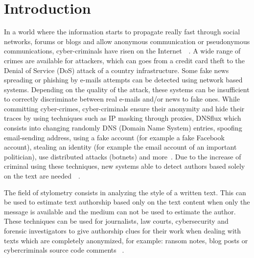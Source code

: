 
\chapter{Introduction \label{sec:introduction}}

In a world where the information starts to propagate really fast through social networks, forums or blogs and allow anonymous communication or pseudonymous communications, cyber-criminals have risen on the Internet~\cite{automated_unsupervised}~\cite{kocher_pan16}.
A wide range of crimes are available for attackers, which can goes from a credit card theft to the Denial of Service (DoS) attack of a country infrastructure.
Some fake news spreading or phishing by e-mails attempts can be detected using network based systems.
Depending on the quality of the attack, these systems can be insufficient to correctly discriminate between real e-mails and/or news to fake ones.
While committing cyber-crimes, cyber-criminals ensure their anonymity and hide their traces by using techniques such as IP masking through proxies, DNSflux which consists into changing randomly DNS (Domain Name System) entries, spoofing email-sending address, using a fake account (for example a fake Facebook account), stealing an identity (for example the email account of an important politician), use distributed attacks (botnets) and more~\cite{attribution_in_cyberspace}.
Due to the increase of criminal using these techniques, new systems able to detect authors based solely on the text are needed~\cite{automated_unsupervised}~\cite{unine_pan20_fake_news}.

The field of stylometry consists in analyzing the style of a written text.
This can be used to estimate text authorship based only on the text content when only the message is available and the medium can not be used to estimate the author.
These techniques can be used for journalists, law courts, cybersecurity and forensic investigators to give authorship clues for their work when dealing with texts which are completely anonymized, for example: ransom notes, blog posts or cybercriminals source code comments ~\cite{pan16_clustering_site}.

